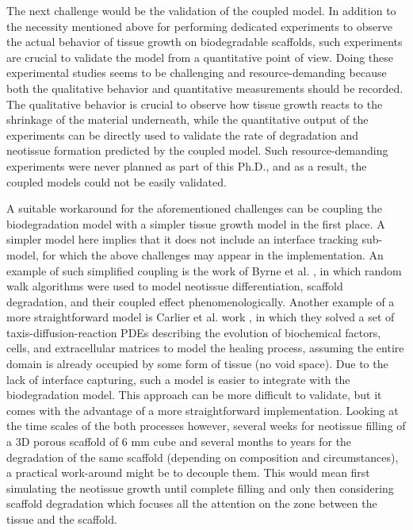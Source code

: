 The next challenge would be the validation of the coupled model. In addition to the necessity mentioned above for performing dedicated experiments to observe the actual behavior of tissue growth on biodegradable scaffolds, such experiments are crucial to validate the model from a quantitative point of view. Doing these experimental studies seems to be challenging and resource-demanding because both the qualitative behavior and quantitative measurements should be recorded. The qualitative behavior is crucial to observe how tissue growth reacts to the shrinkage of the material underneath, while the quantitative output of the experiments can be directly used to validate the rate of degradation and neotissue formation predicted by the coupled model. Such resource-demanding experiments were never planned as part of this Ph.D., and as a result, the coupled models could not be easily validated.


A suitable workaround for the aforementioned challenges can be coupling the biodegradation model with a simpler tissue growth model in the first place. A simpler model here implies that it does not include an interface tracking sub-model, for which the above challenges may appear in the implementation. An example of such simplified coupling is the work of Byrne et al. \cite{Byrne2007}, in which random walk algorithms were used to model neotissue differentiation, scaffold degradation, and their coupled effect phenomenologically. Another example of a more straightforward model is Carlier et al. work \cite{Carlier2012,Carlier2016}, in which they solved a set of taxis-diffusion-reaction \gls{PDE}s describing the evolution of biochemical factors, cells, and extracellular matrices to model the healing process, assuming the entire domain is already occupied by some form of tissue (no void space). Due to the lack of interface capturing, such a model is easier to integrate with the biodegradation model. This approach can be more difficult to validate, but it comes with the advantage of a more straightforward implementation. Looking at the time scales of the both processes however, several weeks for neotissue filling of a 3D porous scaffold of 6 mm cube and several months to years for the degradation of the same scaffold (depending on composition and circumstances), a practical work-around might be to decouple them. This would mean first simulating the neotissue growth until complete filling and only then considering scaffold degradation which focuses all the attention on the zone between the tissue and the scaffold.


